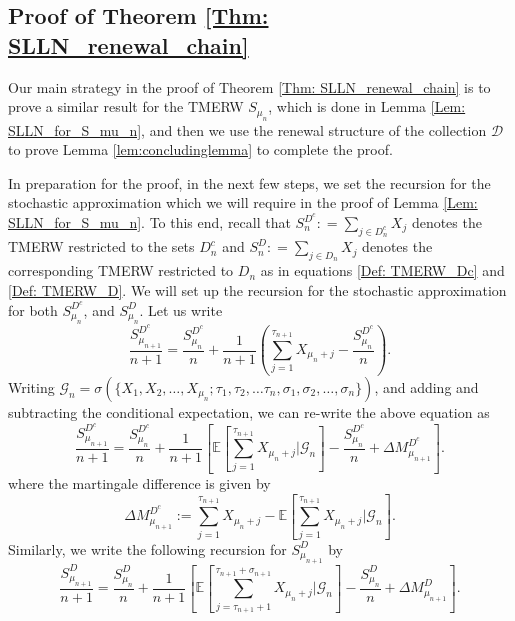 \documentclass{article}
\numberwithin{equation}{section}
\newcommand{\GG}{\mbox{${\mathcal G}$}}
\newcommand{\DD}{\mbox{${\mathcal D}$}}
\newcommand{\1}{\mathbf{1}}
\newcommand{\0}{\mathbf{0}}
\newcommand{\E}{\mbox{${\mathbb E}$}}
\begin{document}
\subsection{Proof of Theorem \ref{Thm: SLLN_renewal_chain}}
Our main strategy in the proof of Theorem \ref{Thm: SLLN_renewal_chain} is to prove a similar result for the TMERW $S_{\mu_n}$, which is done in Lemma \ref{Lem: SLLN_for_S_mu_n}, and then we use the renewal structure of the collection $\DD$ to prove Lemma \ref{lem:concludinglemma} to complete the proof. 

In preparation for the proof, in the next few steps, we set the recursion for the stochastic approximation which we will require in the proof of Lemma \ref{Lem: SLLN_for_S_mu_n}. To this end,   
recall that $S_n^{D^c}: = \sum_{j \in D_n^c} X_j$ denotes the TMERW restricted to the sets $D^c_n$ and $S_n^{D}: = \sum_{j \in D_n} X_j$ denotes the corresponding TMERW restricted to $D_n$ as in equations \eqref{Def: TMERW_Dc} and \eqref{Def: TMERW_D}.
We will set up the recursion for the stochastic approximation for both $S_{\mu_n}^{D^c}$, and $S_{\mu_n}^{D}$. Let us write 
\begin{equation*}
\label{Eq: recursion_for_S_on_Dc_renewal}
\frac{S^{D^c}_{\mu_{n+1}}}{n+1}= \frac{S^{D^c}_{\mu_{n}}}{n}+\frac{1}{n+1} \left(\sum_{j=1}^{\tau_{n+1}} X_{\mu_n +j}-\frac{S^{D^c}_{\mu_{n}}}{n}\right).
\end{equation*}
Writing $\GG_n = \sigma (\{X_1, X_2, \ldots, X_{\mu_n}; \tau_1, \tau_2, \ldots \tau_n, \sigma_1, \sigma_2, \ldots, \sigma_n\})$, and adding and subtracting the conditional expectation, we can re-write the above equation as 
\begin{equation}
\label{Eq: recursion_Dc_step1}
\frac{S^{D^c}_{\mu_{n+1}}}{n+1}= \frac{S^{D^c}_{\mu_{n}}}{n}+\frac{1}{n+1} \left[\E\left[\sum_{j=1}^{\tau_{n+1}} X_{\mu_n +j} \Big | \GG_{n}\right]-\frac{S^{D^c}_{\mu_{n}}}{n}+ \Delta M_{\mu_{n+1}}^{D^c} \right].
\end{equation}
where the martingale difference is given by 
\begin{equation}
\label{Eq: martingale_diff_D_c}
\Delta M_{\mu_{n+1}}^{D^c}:= \sum_{j=1}^{\tau_{n+1}} X_{\mu_n +j}- \E \left[\sum_{j=1}^{\tau_{n+1}} X_{\mu_n +j} \Big | \GG_n\right].
\end{equation}
Similarly, we write the following recursion for $S^{D}_{\mu_{n+1}}$ by 
\begin{equation}
\label{Eq: recursion_D_step1}
\frac{S^{D}_{\mu_{n+1}}}{n+1}= \frac{S^{D}_{\mu_{n}}}{n}+\frac{1}{n+1} \left[\E\left[\sum_{j=\tau_{n+1}+1}^{\tau_{n+1}+\sigma_{n+1}} X_{\mu_n +j} \Big | \GG_{n}\right]-\frac{S^{D}_{\mu_{n}}}{n}+ \Delta M_{\mu_{n+1}}^{D} \right].
\end{equation}
\end{document}

